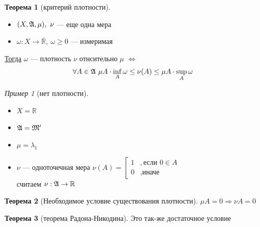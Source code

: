 \documentclass[oneside]{book}
\newcommand{\R}{\mathbb{R}}
\theoremstyle{plain}
\theoremstyle{remark}
\newtheorem*{examp}{Пример}
\theoremstyle{definition}
\newtheorem{theorem}{Теорема}[section]
\begin{document}
\begin{theorem}[критерий плотности]
\-
\begin{itemize}
\item \((X, \mathfrak{A}, \mu),\ \nu\) --- еще одна мера
\item \(\omega: X \to \overline{\R},\ \omega \ge 0\) --- измеримая
\end{itemize}
\uline{Тогда} \(\omega\) --- плотность \(\nu\) отнсительно \(\mu\) \(\Leftrightarrow\)
\[ \forall A \in \mathfrak{A}\ \mu A \cdot \inf_A \omega \le \nu(A) \le \mu A \cdot \sup_A \omega \]
\end{theorem}
\begin{examp}[нет плотности]
\-
\begin{itemize}
\item \(X = \R\)
\item \(\mathfrak{A} = \mathfrak{M}'\)
\item \(\mu = \lambda_1\)
\item \(\nu\) --- одноточечная мера \(\nu(A) = \left[\begin{array}{ll} 1 & ,\text{если } 0 \in A \\ 0 & ,\text{иначе}\end{array}\right.\) \\
считаем \(\nu: \A \to \R\)
\end{itemize}
\end{examp}

\begin{theorem}[Необходимое условие существования плотности]
\(\mu A = 0 \Rightarrow \nu A = 0\)
\end{theorem}
\begin{theorem}[теорема Радона-Никодина]
Это так-же достаточное условие
\end{theorem}
\end{document}
